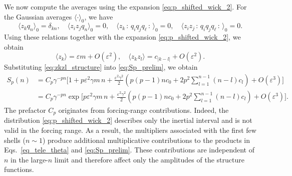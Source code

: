 \documentclass[aps,twocolumn,superscriptaddress]{revtex4-2}
\begin{document}
We now compute the averages using the expansion \eqref{eq:p_shifted_wick_2}.
For the Gaussian averages $\langle \cdot \rangle_0$, we have
\begin{equation}
\langle z_k q_n\rangle_0=\delta_{kn},
\quad
\langle z_iz_j q_n\rangle_0 = 0,
\quad
\langle z_k \,{:}\, q_i q_j q_\ell \,{:}\, \rangle_0=0,
\quad
\langle z_iz_j \,{:}\, q_i q_j q_\ell \,{:}\, \rangle_0=0.
\end{equation}
Using these relations together with the expansion \eqref{eq:p_shifted_wick_2}, we obtain
\begin{equation}
\langle z_k\rangle=\varepsilon m+O(\varepsilon^2), \quad
\langle z_k z_l\rangle = c_{|k-l|}+O(\varepsilon^2).
\label{eq:zkzl_structure}
\end{equation}
Substituting \eqref{eq:zkzl_structure} into \eqref{eq:Sp_prelim}, we obtain
\begin{equation}
\begin{aligned}
S_p(n) &=
C_p\gamma^{-pn}
\Bigg[
1
+p\varepsilon^2 \gamma m\, n
+\frac{\varepsilon^2 \gamma^2}{2}
\left(
p(p-1)n c_0
+2p^2\sum_{l=1}^{n-1}(n-l)c_l
\right)+O(\varepsilon^3)
\Bigg] \\
&=
C_p\gamma^{-pn}
\exp\Bigg[
p\varepsilon^2 \gamma m\, n
+\frac{\varepsilon^2 \gamma^2}{2}
\left(
p(p-1)n c_0
+2p^2\sum_{l=1}^{n-1}(n-l)c_l
\right)+O(\varepsilon^3)
\Bigg].
\end{aligned}
\label{eq_Sp_1SM}
\end{equation}
The prefactor \(C_p\) originates from forcing-range contributions. Indeed, the distribution \eqref{eq:p_shifted_wick_2} describes only the inertial interval and is not valid in the forcing range. As a result, the multipliers associated with the first few shells (\(n\sim1\)) produce additional multiplicative contributions to the products in Eqs.~\eqref{eq_tele_theta} and \eqref{eq:Sp_prelim}. These contributions are independent of \(n\) in the large-\(n\) limit and therefore affect only the amplitudes of the structure functions.
\end{document}
